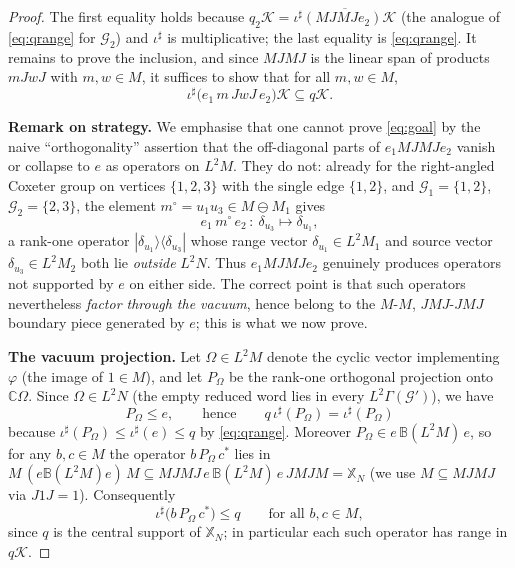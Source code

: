 \documentclass[a4paper, 11pt, reqno]{amsart}
\numberwithin{equation}{section}
\theoremstyle{plain}
\theoremstyle{remark}
\theoremstyle{definition}
\newcommand{\C}{\mathbb{C}}
\newcommand{\B}{\mathbb{B}}
\newcommand{\KK}{{\mathcal K}}
\newcommand{\XX}{{\mathbb{X}}}
\newcommand{\GG}{{\mathcal G}}
\begin{document}
\begin{proof}
The first equality holds because $q_2\KK=\overline{\iota^\sharp(MJMJe_2)\KK}$ (the analogue of \eqref{eq:qrange} for $\GG_2$) and $\iota^\sharp$ is multiplicative; the last equality is \eqref{eq:qrange}. It remains to prove the inclusion, and since $MJMJ$ is the linear span of products $mJwJ$ with $m,w\in M$, it suffices to show that for all $m,w\in M$,
\begin{equation}\label{eq:goal}
\iota^\sharp\big(e_1\,m\,JwJ\,e_2\big)\KK\subseteq q\KK .
\end{equation}

\medskip\noindent\textbf{Remark on strategy.}
We emphasise that one cannot prove \eqref{eq:goal} by the naive ``orthogonality'' assertion that the off-diagonal parts of $e_1MJMJe_2$ vanish or collapse to $e$ as operators on $L^2M$. They do not: already for the right-angled Coxeter group on vertices $\{1,2,3\}$ with the single edge $\{1,2\}$, and $\GG_1=\{1,2\}$, $\GG_2=\{2,3\}$, the element $m^\circ=u_1u_3\in M\ominus M_1$ gives
\[
e_1\,m^\circ\,e_2\,\colon\ \delta_{u_3}\longmapsto\delta_{u_1},
\]
a rank-one operator $|\delta_{u_1}\rangle\langle\delta_{u_3}|$ whose range vector $\delta_{u_1}\in L^2M_1$ and source vector $\delta_{u_3}\in L^2M_2$ both lie \emph{outside} $L^2N$. Thus $e_1MJMJe_2$ genuinely produces operators not supported by $e$ on either side. The correct point is that such operators nevertheless \emph{factor through the vacuum}, hence belong to the $M$-$M$, $JMJ$-$JMJ$ boundary piece generated by $e$; this is what we now prove.

\medskip\noindent\textbf{The vacuum projection.}
Let $\Omega\in L^2M$ denote the cyclic vector implementing $\varphi$ (the image of $1\in M$), and let $P_\Omega$ be the rank-one orthogonal projection onto $\C\Omega$. Since $\Omega\in L^2N$ (the empty reduced word lies in every $L^2\Gamma(\GG')$), we have
\begin{equation}\label{eq:Pomega}
P_\Omega\le e,\qquad\text{hence}\qquad q\,\iota^\sharp(P_\Omega)=\iota^\sharp(P_\Omega)
\end{equation}
because $\iota^\sharp(P_\Omega)\le\iota^\sharp(e)\le q$ by \eqref{eq:qrange}. Moreover $P_\Omega\in e\,\B(L^2M)\,e$, so for any $b,c\in M$ the operator $b\,P_\Omega\,c^*$ lies in $M\,(e\B(L^2M)e)\,M\subseteq MJMJ\,e\,\B(L^2M)\,e\,JMJM=\XX_N$ (we use $M\subseteq MJMJ$ via $J1J=1$). Consequently
\begin{equation}\label{eq:rank-one-inX}
\iota^\sharp\big(b\,P_\Omega\,c^*\big)\le q\qquad\text{for all }b,c\in M,
\end{equation}
since $q$ is the central support of $\XX_N$; in particular each such operator has range in $q\KK$.


\end{proof}
\end{document}
